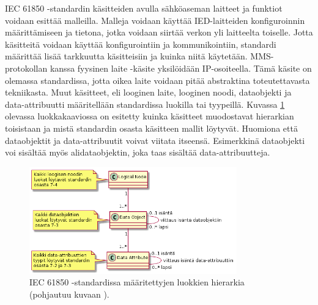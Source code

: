 IEC 61850 -standardin käsitteiden avulla sähköaseman laitteet ja funktiot voidaan esittää malleilla. Malleja voidaan käyttää IED-laitteiden konfiguroinnin määrittämiseen ja tietona, jotka voidaan siirtää verkon yli laitteelta toiselle. Jotta käsitteitä voidaan käyttää konfigurointiin ja kommunikointiin, standardi määrittää lisää tarkkuutta käsitteisiin ja kuinka niitä käytetään. MMS-protokollan kanssa fyysinen laite -käsite yksilöidään IP-osoiteella. Tämä käsite on olemassa standardissa, jotta oikea laite voidaan pitää abstraktina toteutettavasta tekniikasta. Muut käsitteet, eli looginen laite, looginen noodi, dataobjekti ja data-attribuutti määritellään standardissa luokilla tai tyypeillä. Kuvassa \ref{fig:iec61850-class-hierarchy} olevassa luokkakaaviossa on esitetty kuinka käsitteet muodostavat hierarkian toisistaan ja mistä standardin osasta käsitteen mallit löytyvät. Huomiona että dataobjektit ja data-attribuutit voivat viitata itseensä. Esimerkkinä dataobjekti voi sisältää myös alidataobjektin, joka taas sisältää data-attribuutteja. \mbox{\cite[s.~20--22]{IEC61850-7-2}}

\begin{figure}[ht!]
	\includegraphics[width=0.8\textwidth]{pictures/iec61850-class-hierarchy.png}
	\caption{IEC 61850 -standardissa määritettyjen luokkien hierarkia (pohjautuu kuvaan \mbox{\cite[s.~17]{IEC61850-7-2}}).}
	\label{fig:iec61850-class-hierarchy}
\end{figure}

